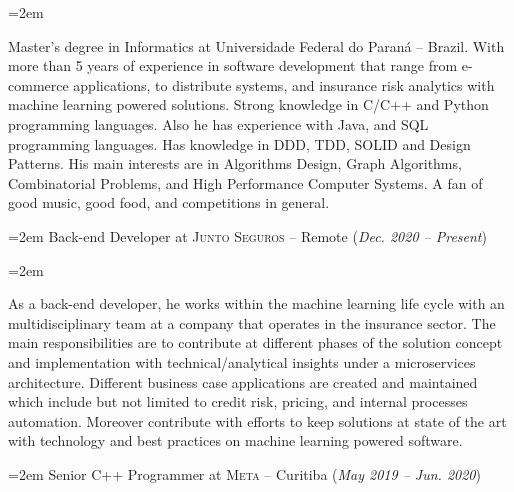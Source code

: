 \documentclass[fontsize=14pt,paper=a4]{scrartcl}
\newcommand{\MarginText}[1]{\marginpar{\raggedleft\itshape\footnotesize#1}}
\newcommand{\WorkEntry}[2]{\noindent\hangindent=2em\hangafter=0%
  {\small #2} {(\small \textit{#1}})\vspace{.5em}}
\newcommand{\Description}[1]{\hangindent=2em\hangafter=0\noindent\raggedright\footnotesize{#1}\par\flushleft\normalsize}
\begin{document}
\begin{cv}
  \noindent{}\vspace{.5em}
  
  \Description{%
    Master's degree in Informatics at Universidade Federal do Paraná --
    Brazil. With more than 5 years of experience in software development that
    range from e-commerce applications, to distribute systems, and insurance
    risk analytics with machine learning powered solutions. Strong knowledge in
    C/C++ and Python programming languages. Also he has experience with Java,
    and SQL programming languages. Has knowledge in DDD, TDD, SOLID and Design
    Patterns. His main interests are in Algorithms Design, Graph Algorithms,
    Combinatorial Problems, and High Performance Computer Systems. A fan of good
    music, good food, and competitions in general.%
  }


  \noindent{}\vspace{.5em}

  \WorkEntry{Dec. 2020 -- Present}{Back-end Developer at \textsc{Junto Seguros} -- Remote}

  \Description{%
    \MarginText{Junto Seguros}%
    As a back-end developer, he works within the machine learning life cycle
    with an multidisciplinary team at a company that operates in the insurance
    sector. The main responsibilities are to contribute at different phases of
    the solution concept and implementation with technical/analytical insights
    under a microservices architecture. Different business case applications are
    created and maintained which include but not limited to credit risk,
    pricing, and internal processes automation. Moreover contribute with efforts
    to keep solutions at state of the art with technology and best practices on
    machine learning powered software. %
  }


  \WorkEntry{May 2019 -- Jun. 2020}{Senior C++ Programmer at \textsc{Meta} -- Curitiba}
  

\end{cv}
\end{document}
